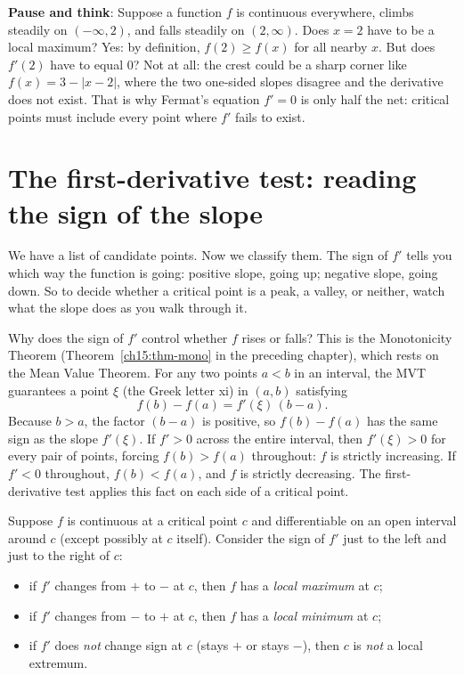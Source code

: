 \begin{recoverybox}
\textbf{Pause and think}: Suppose a function $f$ is continuous everywhere, climbs steadily on $(-\infty, 2)$, and falls steadily on $(2, \infty)$. Does $x=2$ have to be a local maximum? Yes: by definition, $f(2) \ge f(x)$ for all nearby $x$. But does $f'(2)$ have to equal $0$? Not at all: the crest could be a sharp corner like $f(x) = 3 - |x-2|$, where the two one-sided slopes disagree and the derivative does not exist. That is why Fermat's equation $f'=0$ is only half the net: critical points must include every point where $f'$ fails to exist.
\end{recoverybox}

\section{The first-derivative test: reading the sign of the slope}

We have a list of candidate points. Now we classify them. The sign of $f'$ tells
you which way the function is going: positive slope, going up; negative slope,
going down. So to decide whether a critical point is a peak, a valley, or
neither, watch what the slope does as you walk through it.

\begin{whybox}
Why does the sign of $f'$ control whether $f$ rises or falls? This is the
Monotonicity Theorem (Theorem~\ref{ch15:thm-mono} in the preceding chapter),
which rests on the Mean Value Theorem. For any two points $a<b$ in an interval,
the MVT guarantees a point $\xi$ (the Greek letter xi) in $(a,b)$ satisfying
\[
f(b)-f(a)=f'(\xi)\,(b-a).
\]
Because $b>a$, the factor $(b-a)$ is positive, so $f(b)-f(a)$ has the same sign
as the slope $f'(\xi)$.
If $f'>0$ across the entire interval, then $f'(\xi)>0$ for every pair of points,
forcing $f(b)>f(a)$ throughout: $f$ is strictly increasing. If $f'<0$ throughout,
$f(b)<f(a)$, and $f$ is strictly decreasing. The first-derivative test applies
this fact on each side of a critical point.
\end{whybox}

\begin{theorem}\label{ch16:thm-fdt}
Suppose $f$ is continuous at a critical point $c$ and differentiable on an open
interval around $c$ (except possibly at $c$ itself). Consider the sign of $f'$ just
to the left and just to the right of $c$:
\begin{itemize}
\item if $f'$ changes from $+$ to $-$ at $c$, then $f$ has a \emph{local maximum}
at $c$;
\item if $f'$ changes from $-$ to $+$ at $c$, then $f$ has a \emph{local minimum}
at $c$;
\item if $f'$ does \emph{not} change sign at $c$ (stays $+$ or stays $-$), then $c$
is \emph{not} a local extremum.
\end{itemize}
\end{theorem}

